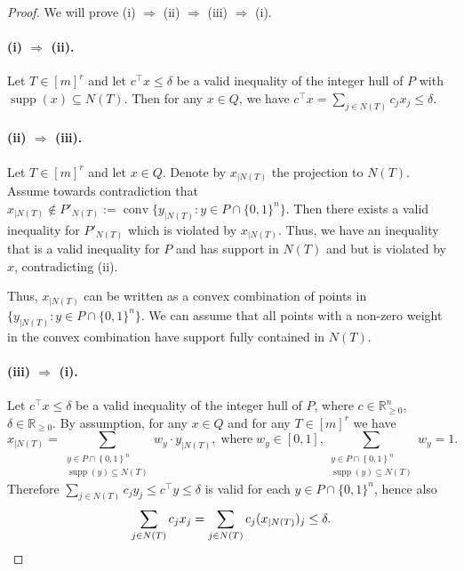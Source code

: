 \documentclass[11pt]{article}
\newcommand{\R}{\mathbb{R}}
\DeclareMathOperator{\supp}{supp}
\DeclareMathOperator{\conv}{conv}
\newcommand{\rhs}{\delta}
\newcommand{\numrows}{r}
\newcommand{\set}[1]{\left\{#1\right\}}
\theoremstyle{remark}
\begin{document}
\begin{proof}
We will prove (i) $\Rightarrow$ (ii) $\Rightarrow$ (iii) $\Rightarrow$ (i). 

\paragraph*{(i) $\Rightarrow$ (ii).} Let $T \in [m]^\numrows$ and let $c^\intercal x \le \rhs$ be a valid inequality of the integer hull of $P$ with $\supp(x) \subseteq N(T)$. Then for any $x\in Q$, we have 
    $c^\intercal x = \sum_{j\in N(T)}c_j x_j \leq \rhs$.
\paragraph*{(ii) $\Rightarrow$ (iii).} 
	Let $T \in [m]^\numrows$ and let $x\in Q$. Denote by $x_{|N(T)}$ the projection to $N(T)$.
	Assume towards contradiction that $x_{|N(T)} \notin P'_{N(T)} := \conv\{y_{|N(T)} : y\in P \cap \{0,1\}^n \}$. Then there exists a valid inequality for $P'_{N(T)}$ which is violated by $x_{|N(T)}$. Thus, we have an inequality that is a valid inequality for $P$ and has support in $N(T)$ and but is violated by $x$, contradicting (ii).

	Thus, $x_{|N(T)}$ can be written as a convex combination of points in $\{y_{|N(T)} : y\in P \cap \{0,1\}^n\}$. We can assume that all points with a non-zero weight in the convex combination have support fully contained in
	$N(T)$.

\paragraph*{(iii) $\Rightarrow$ (i).} Let $c^\intercal x\le \rhs$ be a valid inequality of the integer hull of $P$, where $c \in \R^n_{\ge 0}$, $\rhs \in \R_{\ge 0}$. By assumption, for any $x\in Q$ and for any $T \in [m]^\numrows$ we have 
    \[
	    x_{|N(T)} = \sum_{\substack{y\in P\cap\set{0,1}^n \\ \supp(y)\subseteq N(T)}} w_y \cdot y_{|N(T)}, \;\text{where}\; w_y \in [0,1], \sum_{\substack{y\in P\cap\set{0,1}^n \\ \supp(y)\subseteq N(T)}}w_y = 1.
    \] 
	Therefore $\sum_{j \in N(T)} c_j y_j \le c^\intercal y \le \rhs$ is valid for each $y\in P\cap \{0,1\}^n$, hence also
	\[
		\sum_{j \in N(T)} c_j x_j = \sum_{j \in N(T)} c_j (x_{|N(T)})_j \le \rhs . \qedhere
	\]
\end{proof}
\end{document}
